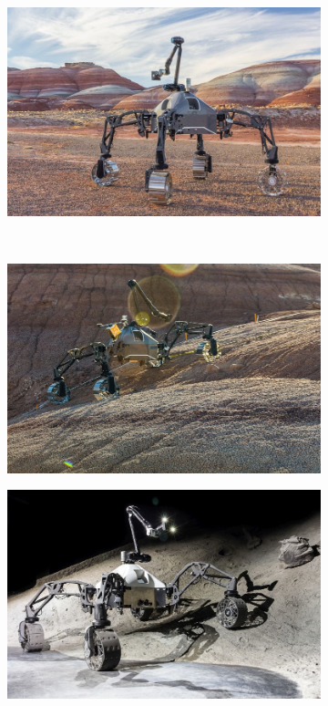 \begin{figure}
\begin{subfigure}[t]{\subfigureWidth}
        \centering
		\includegraphics[height=\graphicsHeight]{pictures/SherpaTT_HighPose}
		\label{fig:SherpaTT_HighPose}
	\end{subfigure}\\[0.8ex]
    \begin{subfigure}[t]{\subfigureWidth}
        \centering
		\includegraphics[height=\graphicsHeight]{pictures/SherpaTT_RPA_Utah}
		\label{fig:SherpaTT_RPA_Utah}
	\end{subfigure}\hfill
	\begin{subfigure}[t]{\subfigureWidth}
        \centering
		\includegraphics[height=\graphicsHeight]{pictures/SherpaTT_RPA_Crater}

\end{subfigure}
\end{figure}
